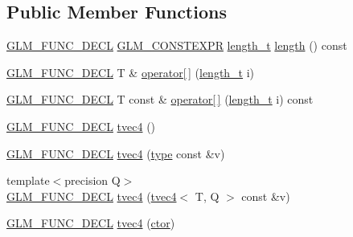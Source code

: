 \subsection*{Public Member Functions}
\begin{DoxyCompactItemize}
\item 
\hyperlink{setup_8hpp_ab2d052de21a70539923e9bcbf6e83a51}{G\+L\+M\+\_\+\+F\+U\+N\+C\+\_\+\+D\+E\+CL} \hyperlink{setup_8hpp_a08b807947b47031d3a511f03f89645ad}{G\+L\+M\+\_\+\+C\+O\+N\+S\+T\+E\+X\+PR} \hyperlink{namespaceglm_a090a0de2260835bee80e71a702492ed9}{length\+\_\+t} \hyperlink{structglm_1_1detail_1_1tvec4_a7a59e6b09b1a2262085cb30cb94eacfc}{length} () const
\item 
\hyperlink{setup_8hpp_ab2d052de21a70539923e9bcbf6e83a51}{G\+L\+M\+\_\+\+F\+U\+N\+C\+\_\+\+D\+E\+CL} T \& \hyperlink{structglm_1_1detail_1_1tvec4_ab3acad4916f2eb3d5e5c438f714eefce}{operator\mbox{[}$\,$\mbox{]}} (\hyperlink{namespaceglm_a090a0de2260835bee80e71a702492ed9}{length\+\_\+t} i)
\item 
\hyperlink{setup_8hpp_ab2d052de21a70539923e9bcbf6e83a51}{G\+L\+M\+\_\+\+F\+U\+N\+C\+\_\+\+D\+E\+CL} T const  \& \hyperlink{structglm_1_1detail_1_1tvec4_a9f756d1667e20dfca248bd12a0c5ad74}{operator\mbox{[}$\,$\mbox{]}} (\hyperlink{namespaceglm_a090a0de2260835bee80e71a702492ed9}{length\+\_\+t} i) const
\item 
\hyperlink{setup_8hpp_ab2d052de21a70539923e9bcbf6e83a51}{G\+L\+M\+\_\+\+F\+U\+N\+C\+\_\+\+D\+E\+CL} \hyperlink{structglm_1_1detail_1_1tvec4_ada663df3fdced3212e73be30374bf5cc}{tvec4} ()
\item 
\hyperlink{setup_8hpp_ab2d052de21a70539923e9bcbf6e83a51}{G\+L\+M\+\_\+\+F\+U\+N\+C\+\_\+\+D\+E\+CL} \hyperlink{structglm_1_1detail_1_1tvec4_afcfdeb0b6acbd1e65de7705a0080bed0}{tvec4} (\hyperlink{structglm_1_1detail_1_1tvec4_a6f73aac80b830832bddd293627bd79b1}{type} const \&v)
\item 
{\footnotesize template$<$precision Q$>$ }\\\hyperlink{setup_8hpp_ab2d052de21a70539923e9bcbf6e83a51}{G\+L\+M\+\_\+\+F\+U\+N\+C\+\_\+\+D\+E\+CL} \hyperlink{structglm_1_1detail_1_1tvec4_a649d25bc38c98c9c95122a08d4eec842}{tvec4} (\hyperlink{structglm_1_1detail_1_1tvec4}{tvec4}$<$ T, Q $>$ const \&v)
\item 
\hyperlink{setup_8hpp_ab2d052de21a70539923e9bcbf6e83a51}{G\+L\+M\+\_\+\+F\+U\+N\+C\+\_\+\+D\+E\+CL} \hyperlink{structglm_1_1detail_1_1tvec4_a76288c36dfc019fc431f373a0deb120a}{tvec4} (\hyperlink{structglm_1_1detail_1_1tvec4_a931ed25f812335023097a513240ae102}{ctor})

\end{DoxyCompactItemize}
